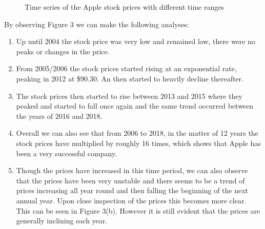 \documentclass[12pt]{report}
\begin{document}
\begin{figure}[!htbp]
    \centering
    \qquad
    \caption{Time series of the Apple stock prices with different time ranges}%
    \label{fig:example}%
\end{figure}

\newpage
\noindent
By observing Figure 3 we can make the following analyses:

\begin{enumerate}
	\item Up until 2004 the stock price was very low and remained low, there were no peaks or changes in the price.
	\item From 2005/2006 the stock prices started rising at an exponential rate, peaking in 2012 at \$90.30. An then started to heavily decline thereafter.
	\item The stock prices then started to rise between 2013 and 2015 where they peaked and started to fall once again and the same trend occurred between the years of 2016 and 2018. 
	\item Overall we can also see that from 2006 to 2018, in the matter of 12 years the stock prices have multiplied by roughly 16 times, which shows that Apple has been a very successful company. 
	\item Though the prices have increased in this time period, we can also observe that the prices have been very unstable and there seems to be a trend of prices increasing all year round and then falling the beginning of the next annual year. Upon close inspection of the prices this becomes more clear. This can be seen in Figure 3(b). However it is still evident that the prices are generally inclining each year. 
\end{enumerate}
\end{document}
